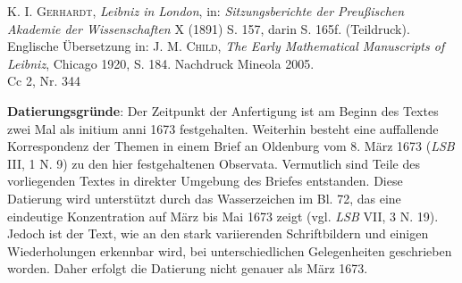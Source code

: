               \begin{ledgroupsized}[r]{114mm}
              \footnotesize 
              \pstart \parindent -6mm
              \textsc{K. I. Gerhardt}, \cite{00241}\textit{Leibniz in London}, in: \textit{Sitzungsberichte der Preußischen Akademie der Wissenschaften} X (1891) S. 157, darin S. 165f. (Teildruck). Englische \"{U}bersetzung in: \textsc{J. M. Child}, \cite{00242}\textit{The Early Mathematical Manuscripts of Leibniz}, Chicago 1920, S. 184. Nachdruck Mineola 2005.\\Cc 2, Nr. 344\pend
              \end{ledgroupsized}
        \vspace*{5mm}
        \begin{ledgroup}
        \footnotesize 
        \pstart
      \noindent\footnotesize{\textbf{Datierungsgr\"{u}nde}: Der Zeitpunkt der Anfertigung ist am Beginn des Textes zwei Mal als initium anni 1673 festgehalten. Weiterhin besteht eine auffallende Korrespondenz der Themen in einem Brief an Oldenburg vom 8. M\"{a}rz 1673 (\textit{LSB} III, 1 N. 9) zu den hier festgehaltenen Observata. Vermutlich sind Teile des vorliegenden Textes in direkter Umgebung des Briefes entstanden. Diese Datierung wird unterst\"{u}tzt durch das Wasserzeichen im Bl. 72, das eine eindeutige Konzentration auf M\"{a}rz bis Mai 1673 zeigt (vgl. \textit{LSB} VII, 3 N. 19). Jedoch ist der Text, wie an den stark variierenden Schriftbildern und einigen Wiederholungen erkennbar wird, bei unterschiedlichen Gelegenheiten geschrieben worden. Daher erfolgt die Datierung nicht genauer als M\"{a}rz 1673.}
        \pend
        \end{ledgroup}
      
